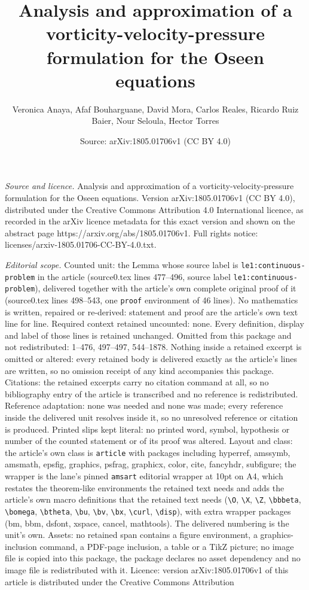 \documentclass[10pt,a4paper]{amsart}
\title[Analysis and approximation of a vorticity-velocity-pressure ]{Analysis and approximation of a vorticity-velocity-pressure formulation for the Oseen equations}
\author{Veronica Anaya, Afaf Bouharguane, David Mora, Carlos Reales, Ricardo Ruiz Baier, Nour Seloula, Hector Torres}
\date{Source: arXiv:1805.01706v1 (CC BY 4.0)}
\begin{document}
\maketitle

\noindent\emph{Source and licence.} Analysis and approximation of a vorticity-velocity-pressure formulation for the Oseen equations. Version arXiv:1805.01706v1 (CC BY 4.0), distributed under the Creative Commons Attribution 4.0 International licence, as recorded in the arXiv licence metadata for this exact version and shown on the abstract page https://arxiv.org/abs/1805.01706v1. Full rights notice: licenses/arxiv-1805.01706-CC-BY-4.0.txt.\par\smallskip

\noindent\textit{Editorial scope.} Counted unit: the Lemma whose source label is \texttt{le1:continuous-problem} in the article (source0.tex lines 477--496, source label \texttt{le1:continuous-problem}), delivered together with the article's own complete original proof of it (source0.tex lines 498--543, one \texttt{proof} environment of 46 lines). No mathematics is written, repaired or re-derived: statement and proof are the article's own text line for line. Required context retained uncounted: none. Every definition, display and label of those lines is retained unchanged. Omitted from this package and not redistributed: 1--476, 497--497, 544--1878. Nothing inside a retained excerpt is omitted or altered: every retained body is delivered exactly as the article's lines are written, so no omission receipt of any kind accompanies this package. Citations: the retained excerpts carry no citation command at all, so no bibliography entry of the article is transcribed and no reference is redistributed. Reference adaptation: none was needed and none was made; every reference inside the delivered unit resolves inside it, so no unresolved reference or citation is produced. Printed slips kept literal: no printed word, symbol, hypothesis or number of the counted statement or of its proof was altered. Layout and class: the article's own class is \texttt{article} with packages including hyperref, amssymb, amsmath, epsfig, graphics, psfrag, graphicx, color, cite, fancyhdr, subfigure; the wrapper is the lane's pinned \texttt{amsart} editorial wrapper at 10pt on A4, which restates the theorem-like environments the retained text needs and adds the article's own macro definitions that the retained text needs (\texttt{\textbackslash O}, \texttt{\textbackslash X}, \texttt{\textbackslash Z}, \texttt{\textbackslash bbbeta}, \texttt{\textbackslash bomega}, \texttt{\textbackslash btheta}, \texttt{\textbackslash bu}, \texttt{\textbackslash bv}, \texttt{\textbackslash bx}, \texttt{\textbackslash curl}, \texttt{\textbackslash disp}), with extra wrapper packages (bm, bbm, dsfont, xspace, cancel, mathtools). The delivered numbering is the unit's own. Assets: no retained span contains a figure environment, a graphics-inclusion command, a PDF-page inclusion, a table or a TikZ picture; no image file is copied into this package, the package declares no asset dependency and no image file is redistributed with it. Licence: version arXiv:1805.01706v1 of this article is distributed under the Creative Commons Attribution 
\end{document}
